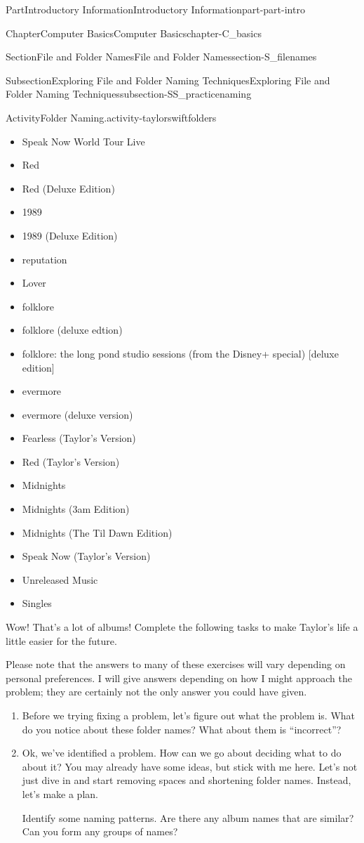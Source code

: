\documentclass[twoside,10pt,]{book}
\begin{document}
\begin{partptx}{Part}{Introductory Information}{}{Introductory Information}{}{}{part-part-intro}
\begin{chapterptx}{Chapter}{Computer Basics}{}{Computer Basics}{}{}{chapter-C_basics}
\begin{sectionptx}{Section}{File and Folder Names}{}{File and Folder Names}{}{}{section-S_filenames}
\begin{subsectionptx}{Subsection}{Exploring File and Folder Naming Techniques}{}{Exploring File and Folder Naming Techniques}{}{}{subsection-SS_practicenaming}
\begin{activity}{Activity}{Folder Naming.}{activity-taylorswiftfolders}
\begin{multicols}{2}
\begin{itemize}[label=\textbullet]
\item{}Speak Now World Tour Live%
\item{}Red%
\item{}Red (Deluxe Edition)%
\item{}1989%
\item{}1989 (Deluxe Edition)%
\item{}reputation%
\item{}Lover%
\item{}folklore%
\item{}folklore (deluxe edtion)%
\item{}folklore: the long pond studio sessions (from the Disney+ special) [deluxe edition]%
\item{}evermore%
\item{}evermore (deluxe version)%
\item{}Fearless (Taylor's Version)%
\item{}Red (Taylor's Version)%
\item{}Midnights%
\item{}Midnights (3am Edition)%
\item{}Midnights (The Til Dawn Edition)%
\item{}Speak Now (Taylor's Version)%
\item{}Unreleased Music%
\item{}Singles%
\end{itemize}
\end{multicols}
%
\par
Wow! That's a lot of albums! Complete the following tasks to make Taylor's life a little easier for the future.%
\par
Please note that the answers to many of these exercises will vary depending on personal preferences. I will give answers depending on how I might approach the problem; they are certainly not the only answer you could have given.%
\begin{enumerate}[font=\bfseries,label=(\alph*),ref=\alph*]%
\item{}Before we trying fixing a problem, let's figure out what the problem is. What do you notice about these folder names? What about them is ``incorrect''?%
\item\label{task-taylorswiftgroups}Ok, we've identified a problem. How can we go about deciding what to do about it? You may already have some ideas, but stick with me here. Let's not just dive in and start removing spaces and shortening folder names. Instead, let's make a plan.%
\par
Identify some naming patterns. Are there any album names that are similar? Can you form any groups of names?%

\end{enumerate}
\end{activity}
\end{subsectionptx}
\end{sectionptx}
\end{chapterptx}
\end{partptx}
\end{document}
